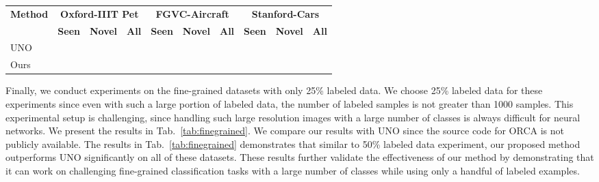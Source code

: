 \documentclass[runningheads]{eccv2022submission}
\begin{document}
\begin{table*}[h]
\caption{Accuracy on \textbf{Oxford-IIIT Pet}, \textbf{FGVC-Aircraft}, and \textbf{Stanford-Cars}  datasets with 25\% labeled data. We consider 50\% classes as seen and 50\% classes as novel.}
\label{tab:finegrained}
\begin{center}\setlength{\tabcolsep}{4pt}
\small
\begin{tabular}{lccc|ccc|ccc}
\hline



\multicolumn{1}{c}{\multirow{2}{*}{\textbf{Method}}} & \multicolumn{3}{c|}{\textbf{Oxford-IIIT Pet}} & \multicolumn{3}{c|}{\textbf{FGVC-Aircraft}} &\multicolumn{3}{c}{\textbf{Stanford-Cars}} \\  
\multicolumn{1}{c}{} & \textbf{Seen} & \textbf{Novel} & \textbf{All}  & \textbf{Seen} & \textbf{Novel} & \textbf{All}  & \textbf{Seen} & \textbf{Novel} & \textbf{All}\\




\hline

UNO\cite{fini2021unified} &  &  &  &  &  &  &  &  & \\
Ours & {\cellcolor{yellow!15}} & {\cellcolor{yellow!15}} & {\cellcolor{yellow!15}} & {\cellcolor{yellow!15}} & {\cellcolor{yellow!15}} & {\cellcolor{yellow!15}} & {\cellcolor{yellow!15}} & {\cellcolor{yellow!15}} & {\cellcolor{yellow!15}}\\\hline 



\end{tabular}
\end{center}


\end{table*}



Finally, we conduct experiments on the fine-grained datasets with only 25\% labeled data. We choose 25\% labeled data for these experiments since even with such a large portion of labeled data, the number of labeled samples is not greater than 1000 samples. This experimental setup is challenging, since handling such large resolution images with a large number of classes is always difficult for neural networks. We present the results in Tab.~\ref{tab:finegrained}. We compare our results with UNO\cite{fini2021unified} since the source code for ORCA is not publicly available. The results in Tab.~\ref{tab:finegrained} demonstrates that similar to 50\% labeled data experiment, our proposed method outperforms UNO significantly on all of these datasets. These results further validate the effectiveness of our method by demonstrating that it can work on challenging fine-grained classification tasks with a large number of classes while using only a handful of labeled examples.    
\end{document}
